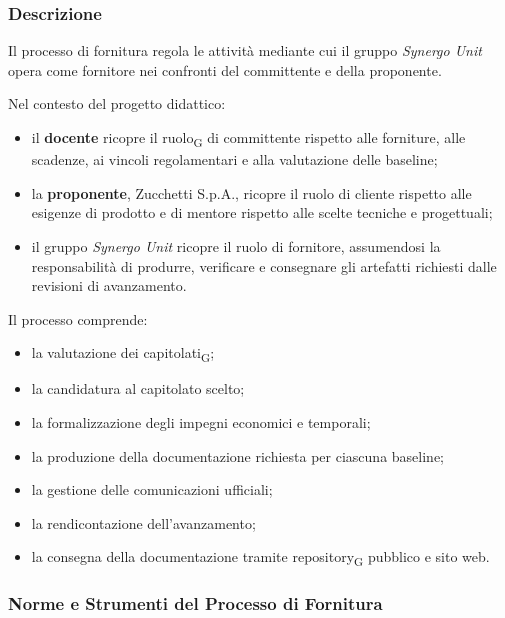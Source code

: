 \subsubsection{Descrizione}

Il processo di fornitura regola le attività mediante cui il gruppo
\textit{Synergo Unit} opera come fornitore nei confronti del committente e della
proponente.

Nel contesto del progetto didattico:

\begin{itemize}
    \item il \textbf{docente} ricopre il ruolo\textsubscript{G} di committente rispetto alle forniture,
    alle scadenze, ai vincoli regolamentari e alla valutazione delle baseline;

    \item la \textbf{proponente}, Zucchetti S.p.A., ricopre il ruolo
    di cliente rispetto alle esigenze di prodotto e di mentore rispetto alle
    scelte tecniche e progettuali;

    \item il gruppo \textit{Synergo Unit} ricopre il ruolo di fornitore, assumendosi
    la responsabilità di produrre, verificare e consegnare gli artefatti richiesti
    dalle revisioni di avanzamento.
\end{itemize}

Il processo comprende:

\begin{itemize}
    \item la valutazione dei capitolati\textsubscript{G};
    \item la candidatura al capitolato scelto;
    \item la formalizzazione degli impegni economici e temporali;
    \item la produzione della documentazione richiesta per ciascuna baseline;
    \item la gestione delle comunicazioni ufficiali;
    \item la rendicontazione dell'avanzamento;
    \item la consegna della documentazione tramite repository\textsubscript{G} pubblico e sito web.
\end{itemize}


\subsubsection{Norme e Strumenti del Processo di Fornitura}

